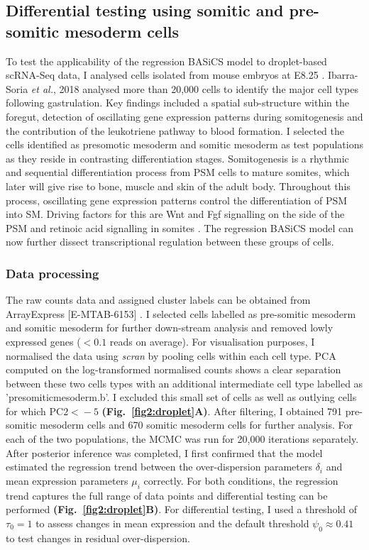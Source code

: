 \newpage

\subsection{Differential testing using somitic and pre-somitic mesoderm cells}

To test the applicability of the regression BASiCS model to droplet-based scRNA-Seq data, I analysed cells isolated from mouse embryos at E8.25 \citep{Ibarra-Soria2018}. Ibarra-Soria \emph{et al.}, 2018 analysed more than 20,000 cells to identify the major cell types following gastrulation. Key findings included a spatial sub-structure within the foregut, detection of oscillating gene expression patterns during somitogenesis and the contribution of the leukotriene pathway to blood formation. I selected the cells identified as presomotic mesoderm and somitic mesoderm as test populations as they reside in contrasting differentiation stages. Somitogenesis is a rhythmic and sequential differentiation process from \gls{PSM} cells to mature somites, which later will give rise to bone, muscle and skin of the adult body. Throughout this process, oscillating gene expression patterns control the differentiation of PSM into \gls{SM}. Driving factors for this are Wnt and \gls{Fgf} signalling on the side of the PSM and retinoic acid signalling in somites \cite{Oates2012}. The regression BASiCS model can now further dissect transcriptional regulation between these groups of cells.

\subsubsection{Data processing}

The raw counts data and assigned cluster labels can be obtained from ArrayExpress [E-MTAB-6153] \citep{Ibarra-Soria2018}. I selected cells labelled as pre-somitic mesoderm and somitic mesoderm for further down-stream analysis and removed lowly expressed genes ($< 0.1$ reads on average). For visualisation purposes, I normalised the data using \emph{scran} by pooling cells within each cell type. PCA computed on the log-transformed normalised counts shows a clear separation between these two cells types with an additional intermediate cell type labelled as 'presomiticmesoderm.b'. I excluded this small set of cells as well as outlying cells for which $\text{PC2}{}<{}-5$ \textbf{(Fig.~\ref{fig2:droplet}A)}. After filtering, I obtained 791 pre-somitic mesoderm cells and 670 somitic mesoderm cells for further analysis. For each of the two populations, the MCMC was run for 20,000 iterations separately. After posterior inference was completed, I first confirmed that the model estimated the regression trend between the over-dispersion parameters $\delta_i$ and mean expression parameters $\mu_i$ correctly. For both conditions, the regression trend captures the full range of data points and differential testing can be performed \textbf{(Fig.~\ref{fig2:droplet}B)}. For differential testing, I used a threshold of $\tau_0=1$ to assess changes in mean expression and the default threshold $\psi_0\approx{}0.41$ to test changes in residual over-dispersion.  

